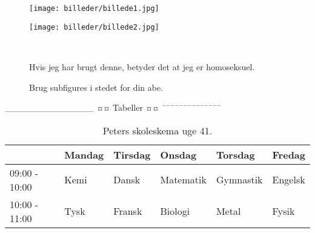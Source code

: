 \begin{figure}[H]
	\centering
	\begin{minipage}[b]{0.48\textwidth}
	\centering
	\texttt{[image: billeder/billede1.jpg]} %
	\end{minipage}
	\hfill
	\begin{minipage}[b]{0.48\textwidth}
	\centering
	\texttt{[image: billeder/billede2.jpg]} %
	\end{minipage}
	\\ %
	\begin{minipage}[t]{0.48\textwidth}
	\caption{Hvis jeg har brugt denne, betyder det at jeg er homoseksuel.} %
	\label{fig:billede1}
	\end{minipage}
	\hfill
	\begin{minipage}[t]{0.48\textwidth}
	\caption{Brug subfigures i stedet for din abe.} %
	\label{fig:billede2}
	\end{minipage}
\end{figure}




______________
¤¤ Tabeller ¤¤
¯¯¯¯¯¯¯¯¯¯¯¯¯¯

\begin{table}[H] 
	\centering 
	\begin{tabular}{|l|l|l|l|l|l|} %
		\hline 	%
					  & Mandag & Tirsdag & Onsdag    & Torsdag   & Fredag  \\ \hline 	%
		09:00 - 10:00 & Kemi   & Dansk   & Matematik & Gymnastik & Engelsk \\ \hline 
		10:00 - 11:00 & Tysk   & Fransk  & Biologi   & Metal     & Fysik   \\ \hline 
	\end{tabular} 
	\caption{Peters skoleskema uge 41.} 
	\label{tab:skoleskema} 
\end{table}

